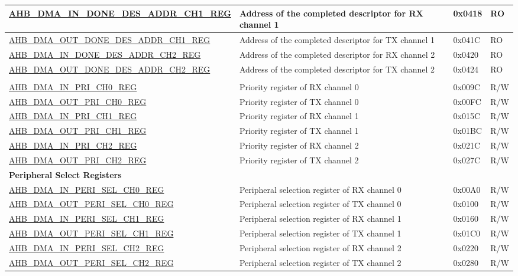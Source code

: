 \begin{longtable}{ | l | p{10cm} | p{1.3cm} | l | }
    \hyperref[regdesc:AHBDMAINDONEDESADDRCHNREG]{AHB\_DMA\_IN\_DONE\_DES\_ADDR\_CH1\_REG} & Address of the completed descriptor for RX channel 1 & 0x0418 & RO \\ \hline
    \hyperref[regdesc:AHBDMAOUTDONEDESADDRCHNREG]{AHB\_DMA\_OUT\_DONE\_DES\_ADDR\_CH1\_REG} & Address of the completed descriptor for TX channel 1 & 0x041C & RO \\ \hline
    \hyperref[regdesc:AHBDMAINDONEDESADDRCHNREG]{AHB\_DMA\_IN\_DONE\_DES\_ADDR\_CH2\_REG} & Address of the completed descriptor for RX channel 2 & 0x0420 & RO \\ \hline
    \hyperref[regdesc:AHBDMAOUTDONEDESADDRCHNREG]{AHB\_DMA\_OUT\_DONE\_DES\_ADDR\_CH2\_REG} & Address of the completed descriptor for TX channel 2 & 0x0424 & RO \\ \hline
\fi
\multicolumn{4}{|l|}{\textbf{Priority Registers}} \\ \hline
\hyperref[regdesc:AHBDMAINPRICHNREG]{AHB\_DMA\_IN\_PRI\_CH0\_REG} & Priority register of RX channel 0 & 0x009C & R/W \\ \hline
\hyperref[regdesc:AHBDMAOUTPRICHNREG]{AHB\_DMA\_OUT\_PRI\_CH0\_REG} & Priority register of TX channel 0 & 0x00FC & R/W \\ \hline
\hyperref[regdesc:AHBDMAINPRICHNREG]{AHB\_DMA\_IN\_PRI\_CH1\_REG} & Priority register of RX channel 1 & 0x015C & R/W \\ \hline
\hyperref[regdesc:AHBDMAOUTPRICHNREG]{AHB\_DMA\_OUT\_PRI\_CH1\_REG} & Priority register of TX channel 1 & 0x01BC & R/W \\ \hline
\hyperref[regdesc:AHBDMAINPRICHNREG]{AHB\_DMA\_IN\_PRI\_CH2\_REG} & Priority register of RX channel 2 & 0x021C & R/W \\ \hline
\hyperref[regdesc:AHBDMAOUTPRICHNREG]{AHB\_DMA\_OUT\_PRI\_CH2\_REG} & Priority register of TX channel 2 & 0x027C & R/W \\ \hline
\multicolumn{4}{|l|}{\textbf{Peripheral Select Registers}} \\ \hline
\hyperref[regdesc:AHBDMAINPERISELCHNREG]{AHB\_DMA\_IN\_PERI\_SEL\_CH0\_REG} & Peripheral selection register of RX channel 0 & 0x00A0 & R/W \\ \hline
\hyperref[regdesc:AHBDMAOUTPERISELCHNREG]{AHB\_DMA\_OUT\_PERI\_SEL\_CH0\_REG} & Peripheral selection register of TX channel 0 & 0x0100 & R/W \\ \hline
\hyperref[regdesc:AHBDMAINPERISELCHNREG]{AHB\_DMA\_IN\_PERI\_SEL\_CH1\_REG} & Peripheral selection register of RX channel 1 & 0x0160 & R/W \\ \hline
\hyperref[regdesc:AHBDMAOUTPERISELCHNREG]{AHB\_DMA\_OUT\_PERI\_SEL\_CH1\_REG} & Peripheral selection register of TX channel 1 & 0x01C0 & R/W \\ \hline
\hyperref[regdesc:AHBDMAINPERISELCHNREG]{AHB\_DMA\_IN\_PERI\_SEL\_CH2\_REG} & Peripheral selection register of RX channel 2 & 0x0220 & R/W \\ \hline
\hyperref[regdesc:AHBDMAOUTPERISELCHNREG]{AHB\_DMA\_OUT\_PERI\_SEL\_CH2\_REG} & Peripheral selection register of TX channel 2 & 0x0280 & R/W \\ \hline
\end{longtable}

